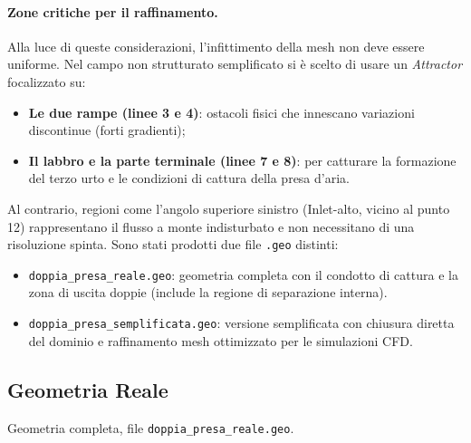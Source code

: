 \paragraph{Zone critiche per il raffinamento.}
Alla luce di queste considerazioni, l'infittimento della mesh non deve essere uniforme. Nel campo non strutturato semplificato si è scelto di usare un \emph{Attractor} focalizzato su:
\begin{itemize}
    \item \textbf{Le due rampe (linee 3 e 4)}: ostacoli fisici che innescano variazioni discontinue (forti gradienti);
    \item \textbf{Il labbro e la parte terminale (linee 7 e 8)}: per catturare la formazione del terzo urto e le condizioni di cattura della presa d'aria.
\end{itemize}
Al contrario, regioni come l'angolo superiore sinistro (Inlet-alto, vicino al punto 12) rappresentano il flusso a monte indisturbato e non necessitano di una risoluzione spinta. 
Sono stati prodotti due file \texttt{.geo} distinti:
\begin{itemize}
  \item \texttt{doppia\_presa\_reale.geo}: geometria completa con il condotto di cattura
    e la zona di uscita doppie (include la regione di separazione interna).
  \item \texttt{doppia\_presa\_semplificata.geo}: versione semplificata con chiusura diretta
    del dominio e raffinamento mesh ottimizzato per le simulazioni CFD.
\end{itemize}

\subsection{Geometria Reale}
\label{sec:presa_reale}

Geometria completa, file \texttt{doppia\_presa\_reale.geo}.

